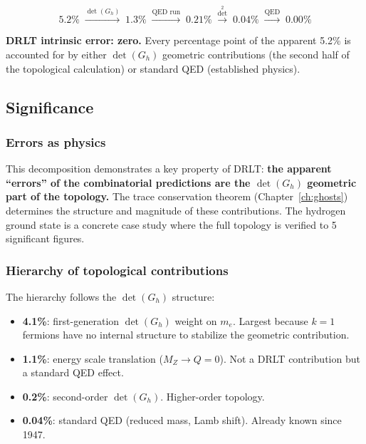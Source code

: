 \documentclass[12pt]{article}
\theoremstyle{remark}
\theoremstyle{definition}
\begin{document}
\begin{equation}
5.2\% \;\xrightarrow{\det(G_h)}\; 1.3\% \;\xrightarrow{\text{QED run}}\; 0.21\% \;\xrightarrow{\det^2}\; 0.04\% \;\xrightarrow{\text{QED}}\; 0.00\%
\end{equation}

\textbf{DRLT intrinsic error: zero.} Every percentage point of the apparent 5.2\% is accounted for by either $\det(G_h)$ geometric contributions (the second half of the topological calculation) or standard QED (established physics).

\subsection{Significance}

\subsubsection{Errors as physics}

This decomposition demonstrates a key property of DRLT: \textbf{the apparent ``errors'' of the combinatorial predictions are the $\det(G_h)$ geometric part of the topology.} The trace conservation theorem (Chapter~\ref{ch:ghosts}) determines the structure and magnitude of these contributions. The hydrogen ground state is a concrete case study where the full topology is verified to 5 significant figures.

\subsubsection{Hierarchy of topological contributions}

The hierarchy follows the $\det(G_h)$ structure:
\begin{itemize}
\item \textbf{4.1\%}: first-generation $\det(G_h)$ weight on $m_e$. Largest because $k = 1$ fermions have no internal structure to stabilize the geometric contribution.
\item \textbf{1.1\%}: energy scale translation ($M_Z \to Q = 0$). Not a DRLT contribution but a standard QED effect.
\item \textbf{0.2\%}: second-order $\det(G_h)$. Higher-order topology.
\item \textbf{0.04\%}: standard QED (reduced mass, Lamb shift). Already known since 1947.
\end{itemize}
\end{document}
